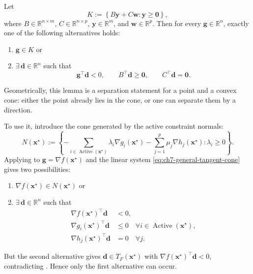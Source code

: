 \begin{lemma}[Farkas]
\label{lem:ch7-farkas}
Let
\[
  K := \left\{B\mathbf{y}+C\mathbf{w}: \mathbf{y}\ge \mathbf{0}\right\},
\]
where $B\in\mathbb{R}^{n\times m}$, $C\in\mathbb{R}^{n\times p}$,
$\mathbf{y}\in\mathbb{R}^m$, and $\mathbf{w}\in\mathbb{R}^p$. Then for
every $\mathbf{g}\in\mathbb{R}^n$, exactly one of the following alternatives
holds:
\begin{enumerate}
  \item $\mathbf{g}\in K$ or
  \item  $\exists\, \mathbf{d}\in\mathbb{R}^n$ such that
  \[
    \mathbf{g}^\top \mathbf{d}<0,
    \qquad
    B^\top \mathbf{d}\ge \mathbf{0},
    \qquad
    C^\top \mathbf{d}=\mathbf{0}.
  \]
\end{enumerate}
\end{lemma}

Geometrically, this lemma is a separation statement for a
point and a convex cone: either the point already lies in the cone, or one can
separate them by a direction.

To use it, introduce the cone generated by the active constraint normals:
\begin{equation}
  \label{eq:ch7-normal-cone}
  N(\mathbf{x}^\star)
  :=
  \left\{
    -\sum_{i\in\operatorname{Active}(\mathbf{x}^\star)} \lambda_i \nabla g_i(\mathbf{x}^\star)
    -\sum_{j=1}^p \mu_j \nabla h_j(\mathbf{x}^\star):
    \lambda_i\ge 0
  \right\}.
\end{equation}
Applying  to
$\mathbf{g}=\nabla f(\mathbf{x}^\star)$ and the linear system
\eqref{eq:ch7-general-tangent-cone} gives two possibilities:
\begin{enumerate}
  \item $\nabla f(\mathbf{x}^\star)\in N(\mathbf{x}^\star)$ or
  \item $\exists\, \mathbf{d}\in\mathbb{R}^n$ such that
  \[
    \begin{aligned}
      \nabla f(\mathbf{x}^\star)^\top \mathbf{d} &<0, \\
      \nabla g_i(\mathbf{x}^\star)^\top \mathbf{d} &\le 0
      \quad \forall i \in\operatorname{Active}(\mathbf{x}^\star), \\
      \nabla h_j(\mathbf{x}^\star)^\top \mathbf{d} &=0
      \quad \forall j.
    \end{aligned}
  \]
\end{enumerate}
But the second alternative gives $\mathbf{d}\in T_F(\mathbf{x}^\star)$ with
$\nabla f(\mathbf{x}^\star)^\top\mathbf{d}<0$, contradicting
. Hence only the first alternative can occur.

